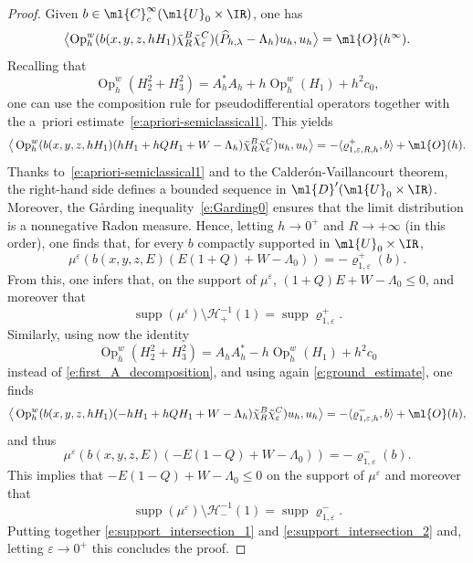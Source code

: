 \documentclass[10pt]{amsart}
\theoremstyle{plain}
\theoremstyle{definition}
\theoremstyle{remark}
\newcommand{\Op}{\operatorname{Op}}
\begin{document}
\begin{proof} Given $b\in\ml{C}^{\infty}_c(\ml{U}_0\times\IR)$, one has
\begin{equation}
\label{e:ground_estimate}
\bigl\langle \Op_h^w(b(x,y,z,hH_1)\tilde{\chi}_R^B\tilde{\chi}_\varepsilon^C)(\widehat{P}_{h,\lambda}-\Lambda_h)u_h,u_h\bigr\rangle=\ml{O}(h^\infty).
\end{equation}
Recalling that
\begin{equation}
\label{e:first_A_decomposition}
\Op_h^w(H^2_2+H_3^2)=A_h^*A_h+h\Op_h^w(H_1) + h^2c_0,
\end{equation}
one can use the composition rule for pseudodifferential operators together with the a~priori estimate~\eqref{e:apriori-semiclassical1}. This yields
\[
\big \langle \Op_h^w(b(x,y,z,hH_1)(hH_1+hQH_1+W-\Lambda_h)\tilde{\chi}_R^B\tilde{\chi}_\varepsilon^C)u_h,u_h\big \rangle = - \langle \varrho^+_{1,\varepsilon,R,h} , b \rangle + \ml{O}(h).
\]
Thanks to~\eqref{e:apriori-semiclassical1} and to the Calderón-Vaillancourt theorem, the right-hand side defines a bounded sequence in $\ml{D}'(\ml{U}_0\times\IR)$. Moreover, the G\aa rding inequality~\eqref{e:Garding0} ensures that the limit distribution is a nonnegative Radon measure. Hence, letting $h\to 0^+$ and $R\to+\infty$ (in this order), one finds that, for every $b$ compactly supported in $\ml{U}_0\times\IR$,
\[
\mu^\varepsilon\left(b(x,y,z,E)(E(1+Q)+W-\Lambda_0)\right)= - \varrho^+_{1,\varepsilon}(b).
\]
From this, one infers that, on the support of $\mu^\varepsilon$, $(1+Q)E + W - \Lambda_0 \leq 0$, and moreover that
\begin{equation}
\label{e:support_intersection_1}
\operatorname{supp}(\mu^\varepsilon) \setminus \mathcal{H}_+^{-1}(1) = \operatorname{supp} \varrho^+_{1,\varepsilon} .
\end{equation}
Similarly, using now the identity
\begin{equation}
\label{e:second_A_decomposition}
\Op_h^w(H^2_2+H_3^2)=A_h A_h^* - h\Op_h^w(H_1) + h^2 c_0
\end{equation}
instead of \eqref{e:first_A_decomposition}, and using again \eqref{e:ground_estimate}, one finds
\[
\big \langle \Op_h^w(b(x,y,z,hH_1)(-hH_1+hQH_1+W-\Lambda_h)\tilde{\chi}_R^B\tilde{\chi}_\varepsilon^C)u_h,u_h\big \rangle = - \langle \varrho_{1,\varepsilon,h}^- , b \rangle + \ml{O}(h),
\]
and thus
\[
\mu^\varepsilon\left(b(x,y,z,E)(-E(1-Q)+W-\Lambda_0)\right)= - \varrho^-_{1,\varepsilon}(b).
\]
This implies that $-E(1-Q) + W - \Lambda_0 \leq 0$ on the support of $\mu^\varepsilon$ and moreover that
\begin{equation}
\label{e:support_intersection_2}
\operatorname{supp}(\mu^\varepsilon) \setminus \mathcal{H}_-^{-1}(1) = \operatorname{supp} \varrho^-_{1,\varepsilon} .
\end{equation}
Putting together \eqref{e:support_intersection_1} and \eqref{e:support_intersection_2} and, letting $\varepsilon\to 0^+$ this concludes the proof.
\end{proof}
\end{document}
